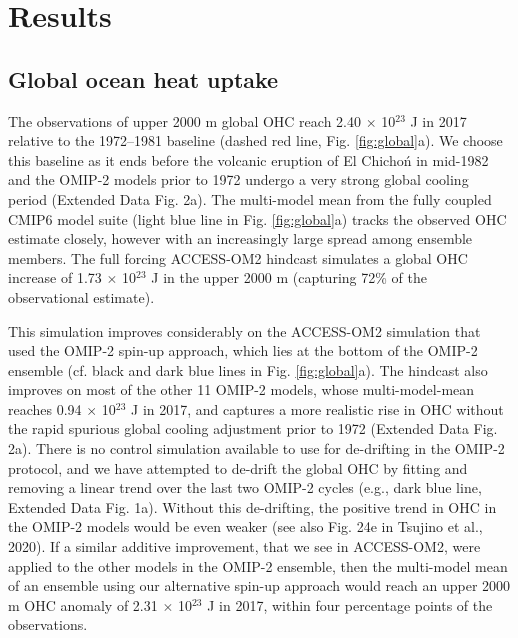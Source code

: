 \documentclass{nature}
\begin{document}
	\section*{Results}
	\subsection{Global ocean heat uptake}
	The observations of upper 2000 m global OHC\cite{levitus2012global} reach 2.40 $\times$ 10$^{23}$ J in 2017 relative to the 1972--1981 baseline (dashed red line, Fig. \ref{fig:global}a). We choose this baseline as it ends before the volcanic eruption of El Chicho\'n in mid-1982 and the OMIP-2 models prior to 1972 undergo a very strong global cooling period (Extended Data Fig. 2a). The multi-model mean from the fully coupled CMIP6 model suite (light blue line in Fig. \ref{fig:global}a) tracks the observed OHC estimate closely, however with an increasingly large spread among ensemble members. The full forcing ACCESS-OM2 hindcast simulates a global OHC increase of 1.73 $\times$ 10$^{23}$ J in the upper 2000 m (capturing 72\% of the observational estimate). 
	
	This simulation improves considerably on the ACCESS-OM2 simulation that used the OMIP-2 spin-up approach, which lies at the bottom of the OMIP-2 ensemble (cf. black and dark blue lines in Fig. \ref{fig:global}a). The hindcast also improves on most of the other 11 OMIP-2 models\cite{tsujino2020omip}, whose multi-model-mean reaches 0.94 $\times$ 10$^{23}$ J in 2017, and captures a more realistic rise in OHC without the rapid spurious global cooling adjustment prior to 1972 (Extended Data Fig. 2a). There is no control simulation available to use for de-drifting in the OMIP-2 protocol, and we have attempted to de-drift the global OHC by fitting and removing a linear trend over the last two OMIP-2 cycles (e.g., dark blue line, Extended Data Fig. 1a). Without this de-drifting, the positive trend in OHC in the OMIP-2 models would be even weaker (see also Fig. 24e in Tsujino et al., 2020\cite{tsujino2020omip}). If a similar additive improvement, that we see in ACCESS-OM2, were applied to the other models in the OMIP-2 ensemble, then the multi-model mean of an ensemble using our alternative spin-up approach would reach an upper 2000 m OHC anomaly of 2.31 $\times$ 10$^{23}$ J in 2017, within four percentage points of the observations\cite{levitus2012global}.
	
\end{document}
